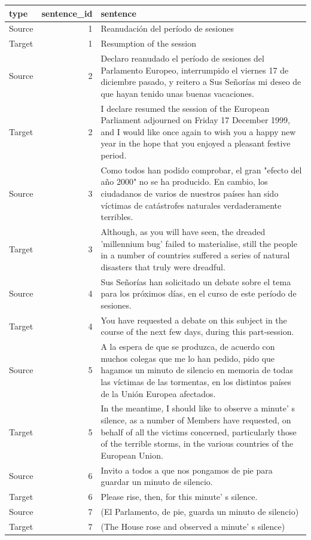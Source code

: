 \documentclass[
  letterpaper,
]{scrbook}
\begin{document}
\begin{table}
\centering
\begin{tabular}{lrl}
\toprule
type & sentence\_id & sentence\\
\midrule
Source & 1 & Reanudación del período de sesiones\\
Target & 1 & Resumption of the session\\
Source & 2 & Declaro reanudado el período de sesiones del Parlamento Europeo, interrumpido el viernes 17 de diciembre pasado, y reitero a Sus Señorías mi deseo de que hayan tenido unas buenas vacaciones.\\
Target & 2 & I declare resumed the session of the European Parliament adjourned on Friday 17 December 1999, and I would like once again to wish you a happy new year in the hope that you enjoyed a pleasant festive period.\\
Source & 3 & Como todos han podido comprobar, el gran "efecto del año 2000" no se ha producido. En cambio, los ciudadanos de varios de nuestros países han sido víctimas de catástrofes naturales verdaderamente terribles.\\
\addlinespace
Target & 3 & Although, as you will have seen, the dreaded 'millennium bug' failed to materialise, still the people in a number of countries suffered a series of natural disasters that truly were dreadful.\\
Source & 4 & Sus Señorías han solicitado un debate sobre el tema para los próximos días, en el curso de este período de sesiones.\\
Target & 4 & You have requested a debate on this subject in the course of the next few days, during this part-session.\\
Source & 5 & A la espera de que se produzca, de acuerdo con muchos colegas que me lo han pedido, pido que hagamos un minuto de silencio en memoria de todas las víctimas de las tormentas, en los distintos países de la Unión Europea afectados.\\
Target & 5 & In the meantime, I should like to observe a minute' s silence, as a number of Members have requested, on behalf of all the victims concerned, particularly those of the terrible storms, in the various countries of the European Union.\\
\addlinespace
Source & 6 & Invito a todos a que nos pongamos de pie para guardar un minuto de silencio.\\
Target & 6 & Please rise, then, for this minute' s silence.\\
Source & 7 & (El Parlamento, de pie, guarda un minuto de silencio)\\
Target & 7 & (The House rose and observed a minute' s silence)\\
\bottomrule
\end{tabular}
\end{table}
\end{document}
